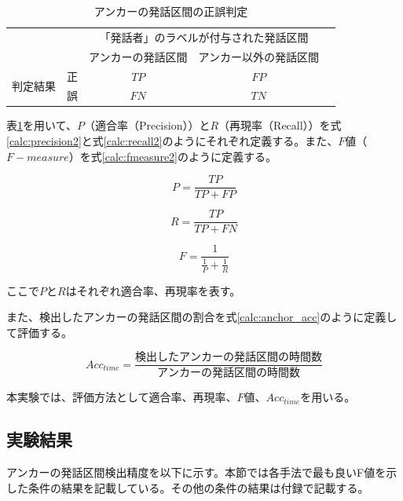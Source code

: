 \begin{table}[H]
\begin{center}
    \caption{アンカーの発話区間の正誤判定 \label{table:clustering}}
\begin{tabular}{|c|c|c|c|l}
\cline{1-4}
\multicolumn{2}{|c|}{\multirow{2}{*}{}} & \multicolumn{2}{c|}{「発話者」のラベルが付与された発話区間} &  \\ \cline{3-4}
\multicolumn{2}{|c|}{}                  & アンカーの発話区間        & アンカー以外の発話区間        &  \\ \cline{1-4}
\multirow{2}{*}{判定結果}        & 正        & $TP$                  & $FP$                   &  \\ \cline{2-4}
& 誤        & $FN$                  & $TN$                   &  \\ \cline{1-4}
\end{tabular}
\end{center}
\end{table}

表\ref{table:clustering}を用いて、$P$（適合率（Precision））と$R$（再現率（Recall））を式\ref{calc:precision2}と式\ref{calc:recall2}のようにそれぞれ定義する。また、$F$値（$F-measure$）を式\ref{calc:fmeasure2}のように定義する。

\begin{equation}
\label{calc:precision2}
P = \frac{TP}{TP + FP}
\end{equation}

\begin{equation}
\label{calc:recall2}
R = \frac{TP}{TP + FN}
\end{equation}

\begin{equation}
\label{calc:fmeasure2}
F = \frac{1}{\frac{1}{P} + \frac{1}{R}}
\end{equation}

ここで$P$と$R$はそれぞれ適合率、再現率を表す。

また、検出したアンカーの発話区間の割合を式\ref{calc:anchor_acc}のように定義して評価する。

\begin{equation}
\label{calc:anchor_acc}
Acc_{time} = \frac{検出したアンカーの発話区間の時間数}{アンカーの発話区間の時間数}
\end{equation}

本実験では、評価方法として適合率、再現率、$F$値、$Acc_{time}$を用いる。

\subsection{実験結果}
アンカーの発話区間検出精度を以下に示す。本節では各手法で最も良いF値を示した条件の結果を記載している。その他の条件の結果は付録で記載する。

